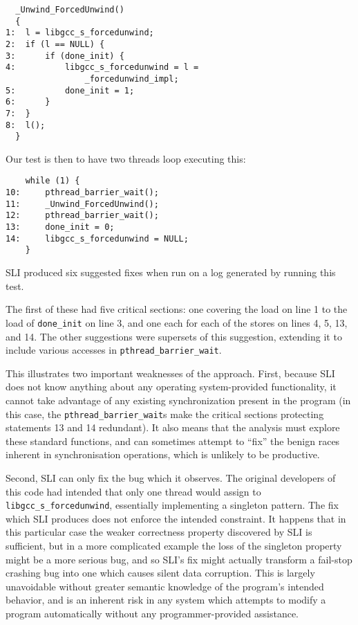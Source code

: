 \documentclass[10pt,twocolumn,preprint,natbib,authoryear]{sigplanconf}
\begin{document}
\begin{verbatim}
  _Unwind_ForcedUnwind()
  {
1:  l = libgcc_s_forcedunwind;
2:  if (l == NULL) {
3:      if (done_init) {
4:          libgcc_s_forcedunwind = l =
                _forcedunwind_impl;
5:          done_init = 1;
6:      }
7:  }
8:  l();
  }
\end{verbatim}

Our test is then to have two threads loop executing this:

\begin{verbatim}
    while (1) {
10:     pthread_barrier_wait();
11:     _Unwind_ForcedUnwind();
12:     pthread_barrier_wait();
13:     done_init = 0;
14:     libgcc_s_forcedunwind = NULL;
    }
\end{verbatim}

SLI produced six suggested fixes when run on a log generated by
running this test.

The first of these had five critical sections: one covering the load
on line 1 to the load of \verb|done_init| on line 3, and one each for
each of the stores on lines 4, 5, 13, and 14.  The other suggestions
were supersets of this suggestion, extending it to include various
accesses in \verb|pthread_barrier_wait|.

This illustrates two important weaknesses of the approach.  First,
because SLI does not know anything about any operating system-provided
functionality, it cannot take advantage of any existing
synchronization present in the program (in this case, the
\verb|pthread_barrier_wait|s make the critical sections protecting
statements 13 and 14 redundant).  It also means that the analysis must
explore these standard functions, and can sometimes attempt to ``fix''
the benign races inherent in synchronisation operations, which is
unlikely to be productive.

Second, SLI can only fix the bug which it observes.  The original
developers of this code had intended that only one thread would assign
to \verb|libgcc_s_forcedunwind|, essentially implementing a singleton
pattern.  The fix which SLI produces does not enforce the intended
constraint.  It happens that in this particular case the weaker
correctness property discovered by SLI is sufficient, but in a more
complicated example the loss of the singleton property might be a more
serious bug, and so SLI's fix might actually transform a fail-stop
crashing bug into one which causes silent data corruption.  This is
largely unavoidable without greater semantic knowledge of the
program's intended behavior, and is an inherent risk in any system
which attempts to modify a program automatically without any
programmer-provided assistance.
\end{document}
